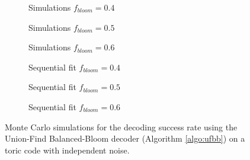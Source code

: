 \begin{figure}[htbp]
  \centering
  \begin{subfigure}[b]{0.32\textwidth}
    \begin{adjustbox}{Clip=0 1em 0 0}
      
    \end{adjustbox}
    \caption{Simulations $f_{bloom}=0.4$}
  \end{subfigure}
  \begin{subfigure}[b]{0.32\textwidth}
    \begin{adjustbox}{Clip=0 1em 0 0}
      
    \end{adjustbox}
    \caption{Simulations $f_{bloom}=0.5$}
  \end{subfigure}
  \begin{subfigure}[b]{0.32\textwidth}
    \begin{adjustbox}{Clip=0 1em 0 0}
      
    \end{adjustbox}
    \caption{Simulations $f_{bloom}=0.6$}
  \end{subfigure}

  \begin{subfigure}[b]{0.32\textwidth}
    \begin{adjustbox}{Clip=0 1em 0 0}
      
    \end{adjustbox}
    \caption{Sequential fit $f_{bloom}=0.4$}
  \end{subfigure}
  \begin{subfigure}[b]{0.32\textwidth}
    \begin{adjustbox}{Clip=0 1em 0 0}
      
    \end{adjustbox}
    \caption{Sequential fit $f_{bloom}=0.5$}
  \end{subfigure}
  \begin{subfigure}[b]{0.32\textwidth}
    \begin{adjustbox}{Clip=0 1em 0 0}
      
    \end{adjustbox}
    \caption{Sequential fit $f_{bloom}=0.6$}
  \end{subfigure}

  \caption{Monte Carlo simulations for the decoding success rate using the Union-Find Balanced-Bloom decoder (Algorithm \ref{algo:ufbb}) on a toric code with independent noise.}
  \label{fig:thres_ufbb_toric_2d_fb}
\end{figure}

